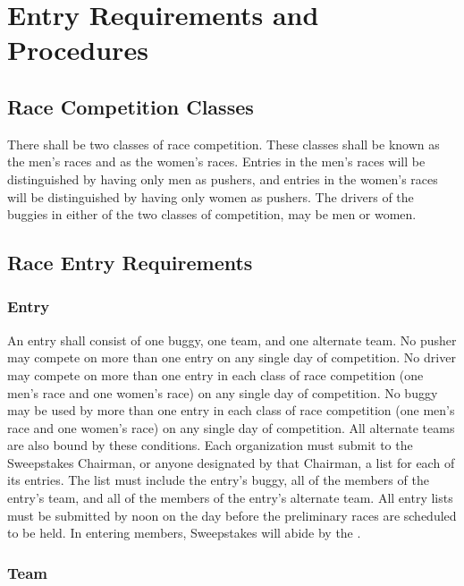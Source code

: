 \chapter{Entry Requirements and Procedures}

\section{Race Competition Classes}

	There shall be two classes of race competition. These classes shall be known as the men's races and as the women's races. Entries in the men's races will be distinguished by having only men as pushers, and entries in the women's races will be distinguished by having only women as pushers. The drivers of the buggies in either of the two classes of competition, may be men or women.

\section{Race Entry Requirements}

\subsection{Entry}

An entry shall consist of one buggy, one team, and one alternate team. No pusher may compete on more than one entry on any single day of competition. No driver may compete on more than one entry in each class of race competition (one men's race and one women's race) on any single day of competition. No buggy may be used by more than one entry in each class of race competition (one men's race and one women's race) on any single day of competition. All alternate teams are also bound by these conditions. Each organization must submit to the Sweepstakes Chairman, or anyone designated by that Chairman, a list for each of its entries. The list must include the entry's buggy, all of the members of the entry's team, and all of the members of the entry's alternate team. All entry lists must be submitted by noon on the day before the preliminary races are scheduled to be held. In entering members, Sweepstakes will abide by the .

\subsection{Team}

